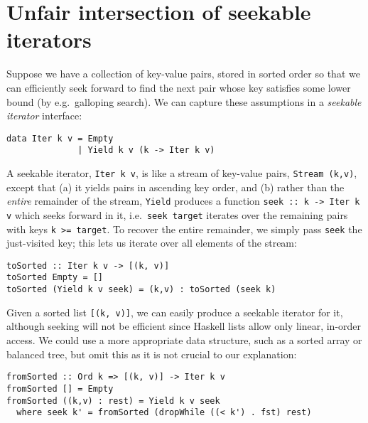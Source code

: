 \documentclass[acmsmall,screen,review,anonymous,dvipsnames,svgnames]{acmart}
\newcommand\hask[1]{\texttt{#1}}
\newcommand\ttt\texttt
\newcommand\todo[1]{{\color{Orange}#1}}
\renewcommand\todo[1]{{\color{IndianRed}#1}}
\begin{document}



\section{Unfair intersection of seekable iterators}
\label{sec:unfair-intersection}

Suppose we have a collection of key-value pairs, stored in sorted order so that we can efficiently seek forward to find the next pair whose key satisfies some lower bound (by e.g.\ galloping search).
We can capture these assumptions in a \emph{seekable iterator} interface:

\begin{verbatim}
data Iter k v = Empty
              | Yield k v (k -> Iter k v)
\end{verbatim}

\noindent
A seekable iterator, \hask{Iter k v}, is like a stream of key-value pairs, \hask{Stream (k,v)}, except that (a) it yields pairs in ascending key order, and (b) rather than the \emph{entire} remainder of the stream, \hask{Yield} produces a function \hask{seek :: k -> Iter k v} which seeks forward in it, i.e.\ \ttt{seek target} iterates over the remaining pairs with keys \ttt{k >= target}.
%
To recover the entire remainder, we simply pass \ttt{seek} the just-visited key; this lets us iterate over all elements of the stream:

\begin{verbatim}
toSorted :: Iter k v -> [(k, v)]
toSorted Empty = []
toSorted (Yield k v seek) = (k,v) : toSorted (seek k)
\end{verbatim}

\noindent
Given a sorted list \hask{[(k, v)]}, we can easily produce a seekable iterator for it, although seeking will not be efficient since Haskell lists allow only linear, in-order access.
We could use a more appropriate data structure, such as a sorted array or balanced tree, but omit this as it is not crucial to our explanation:

\begin{verbatim}
fromSorted :: Ord k => [(k, v)] -> Iter k v
fromSorted [] = Empty
fromSorted ((k,v) : rest) = Yield k v seek
  where seek k' = fromSorted (dropWhile ((< k') . fst) rest)
\end{verbatim}
\end{document}
